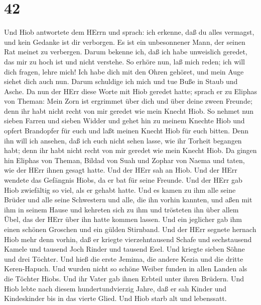 \hypertarget{section-41}{%
\section{42}\label{section-41}}

 Und Hiob antwortete dem HErrn und sprach:  ich
erkenne, daß du alles vermagst, und kein Gedanke ist dir verborgen.
 Es ist ein unbesonnener Mann, der seinen Rat meinet zu
verbergen. Darum bekenne ich, daß ich habe unweislich geredet, das mir
zu hoch ist und nicht verstehe.  So erhöre nun, laß mich
reden; ich will dich fragen, lehre mich!  Ich habe dich mit
den Ohren gehöret, und mein Auge siehet dich auch nun. 
Darum schuldige ich mich und tue Buße in Staub und Asche. 
Da nun der HErr diese Worte mit Hiob geredet hatte; sprach er zu Eliphas
von Theman: Mein Zorn ist ergrimmet über dich und über deine zween
Freunde; denn ihr habt nicht recht von mir geredet wie mein Knecht Hiob.
 So nehmet nun sieben Farren und sieben Widder und gehet hin
zu meinem Knechte Hiob und opfert Brandopfer für euch und laßt meinen
Knecht Hiob für euch bitten. Denn ihn will ich ansehen, daß ich euch
nicht sehen lasse, wie ihr Torheit begangen habt; denn ihr habt nicht
recht von mir geredet wie mein Knecht Hiob.  Da gingen hin
Eliphas von Theman, Bildad von Suah und Zophar von Naema und taten, wie
der HErr ihnen gesagt hatte. Und der HErr sah an Hiob.  Und
der HErr wendete das Gefängnis Hiobs, da er bat für seine Freunde. Und
der HErr gab Hiob zwiefältig so viel, als er gehabt hatte. 
Und es kamen zu ihm alle seine Brüder und alle seine Schwestern und
alle, die ihn vorhin kannten, und aßen mit ihm in seinem Hause und
kehreten sich zu ihm und trösteten ihn über allem Übel, das der HErr
über ihn hatte kommen lassen. Und ein jeglicher gab ihm einen schönen
Groschen und ein gülden Stirnband.  Und der HErr segnete
hernach Hiob mehr denn vorhin, daß er kriegte vierzehntausend Schafe und
sechstausend Kamele und tausend Joch Rinder und tausend Esel.
 Und kriegte sieben Söhne und drei Töchter. 
Und hieß die erste Jemima, die andere Kezia und die dritte Keren-Hapuch.
 Und wurden nicht so schöne Weiber funden in allen Landen
als die Töchter Hiobs. Und ihr Vater gab ihnen Erbteil unter ihren
Brüdern.  Und Hiob lebte nach diesem hundertundvierzig
Jahre, daß er sah Kinder und Kindeskinder bis in das vierte Glied.
 Und Hiob starb alt und lebenssatt.
